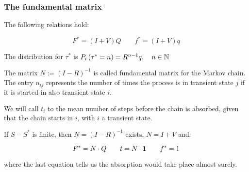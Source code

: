  \begin{frame} \frametitle{The fundamental matrix}
    \vspace{2em}
    
    \begin{proposition}
    The following relations hold:

    \[
    F^{\ast} = (I + V)Q \qquad
    f^{\ast} = (I + V)q
    \]

    The distribution for \(\tau^{\ast}\) is \(P_i\left({\tau^{\ast} = n}\right) = R^{n - 1}q, \quad n \in \mathbb{N}\)
    \end{proposition}
  
    \begin{definition}
    The matrix \(N := (I - R)^{-1}\) is called fundamental matrix for the Markov chain. 
    The entry \(n_{ij}\) represents the number of times the process is in transient state \(j\) 
    if it is started in also transient state \(i\).
    \end{definition}

    \begin{definition}
    We will call \(t_i\) to the mean number of steps before the chain is absorbed, given that 
    the chain starts in \(i\), with \(i\) a transient state.
    \end{definition}
    
    \begin{proposition}
    If \(S - S^{\ast}\) is finite, then \(N = (I - R)^{-1}\) exists, \(N = I + V\) and:

    \[
    F^{\ast} = N\cdot Q \qquad 
    t = N \cdot \mathbf{1} \qquad
    f^{\ast} = 1
    \]

    where the last equation tells us the absorption would take place almost surely.
    \end{proposition}
  
 \end{frame}



